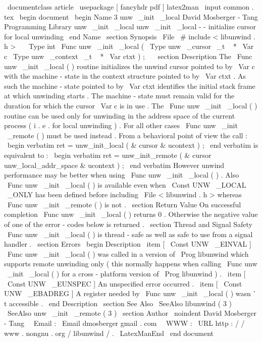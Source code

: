 \
documentclass
{
article
}
\
usepackage
[
fancyhdr
pdf
]
{
latex2man
}
\
input
{
common
.
tex
}
\
begin
{
document
}
\
begin
{
Name
}
{
3
}
{
unw
\
_init
\
_local
}
{
David
Mosberger
-
Tang
}
{
Programming
Library
}
{
unw
\
_init
\
_local
}
unw
\
_init
\
_local
-
-
initialize
cursor
for
local
unwinding
\
end
{
Name
}
\
section
{
Synopsis
}
\
File
{
\
#
include
<
libunwind
.
h
>
}
\
\
\
Type
{
int
}
\
Func
{
unw
\
_init
\
_local
}
(
\
Type
{
unw
\
_cursor
\
_t
~
*
}
\
Var
{
c
}
\
Type
{
unw
\
_context
\
_t
~
*
}
\
Var
{
ctxt
}
)
;
\
\
\
section
{
Description
}
The
\
Func
{
unw
\
_init
\
_local
}
(
)
routine
initializes
the
unwind
cursor
pointed
to
by
\
Var
{
c
}
with
the
machine
-
state
in
the
context
structure
pointed
to
by
\
Var
{
ctxt
}
.
As
such
the
machine
-
state
pointed
to
by
\
Var
{
ctxt
}
identifies
the
initial
stack
frame
at
which
unwinding
starts
.
The
machine
-
state
must
remain
valid
for
the
duration
for
which
the
cursor
\
Var
{
c
}
is
in
use
.
The
\
Func
{
unw
\
_init
\
_local
}
(
)
routine
can
be
used
only
for
unwinding
in
the
address
space
of
the
current
process
(
i
.
e
.
for
local
unwinding
)
.
For
all
other
cases
\
Func
{
unw
\
_init
\
_remote
}
(
)
must
be
used
instead
.
From
a
behavioral
point
of
view
the
call
:
\
begin
{
verbatim
}
ret
=
unw_init_local
(
&
cursor
&
ucontext
)
;
\
end
{
verbatim
}
is
equivalent
to
:
\
begin
{
verbatim
}
ret
=
unw_init_remote
(
&
cursor
unw_local_addr_space
&
ucontext
)
;
\
end
{
verbatim
}
However
unwind
performance
may
be
better
when
using
\
Func
{
unw
\
_init
\
_local
}
(
)
.
Also
\
Func
{
unw
\
_init
\
_local
}
(
)
is
available
even
when
\
Const
{
UNW
\
_LOCAL
\
_ONLY
}
has
been
defined
before
including
\
File
{
<
libunwind
.
h
>
}
whereas
\
Func
{
unw
\
_init
\
_remote
}
(
)
is
not
.
\
section
{
Return
Value
}
On
successful
completion
\
Func
{
unw
\
_init
\
_local
}
(
)
returns
0
.
Otherwise
the
negative
value
of
one
of
the
error
-
codes
below
is
returned
.
\
section
{
Thread
and
Signal
Safety
}
\
Func
{
unw
\
_init
\
_local
}
(
)
is
thread
-
safe
as
well
as
safe
to
use
from
a
signal
handler
.
\
section
{
Errors
}
\
begin
{
Description
}
\
item
[
\
Const
{
UNW
\
_EINVAL
}
]
\
Func
{
unw
\
_init
\
_local
}
(
)
was
called
in
a
version
of
\
Prog
{
libunwind
}
which
supports
remote
unwinding
only
(
this
normally
happens
when
calling
\
Func
{
unw
\
_init
\
_local
}
(
)
for
a
cross
-
platform
version
of
\
Prog
{
libunwind
}
)
.
\
item
[
\
Const
{
UNW
\
_EUNSPEC
}
]
An
unspecified
error
occurred
.
\
item
[
\
Const
{
UNW
\
_EBADREG
}
]
A
register
needed
by
\
Func
{
unw
\
_init
\
_local
}
(
)
wasn
'
t
accessible
.
\
end
{
Description
}
\
section
{
See
Also
}
\
SeeAlso
{
libunwind
(
3
)
}
\
SeeAlso
{
unw
\
_init
\
_remote
(
3
)
}
\
section
{
Author
}
\
noindent
David
Mosberger
-
Tang
\
\
Email
:
\
Email
{
dmosberger
gmail
.
com
}
\
\
WWW
:
\
URL
{
http
:
/
/
www
.
nongnu
.
org
/
libunwind
/
}
.
\
LatexManEnd
\
end
{
document
}
